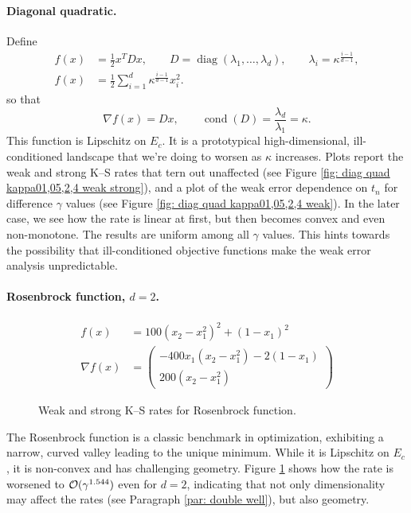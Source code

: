 \documentclass[12pt]{article}
\begin{document}
\paragraph{Diagonal quadratic.}
Define
\begin{align*}
    f(x) &= \frac{1}{2} x^T D x, \qquad D = \operatorname{diag}(\lambda_1, \dots, \lambda_d), \qquad \lambda_i = \kappa^{\frac{i-1}{d-1}},\\
    f(x) &= \frac{1}{2} \sum_{i=1}^d \kappa^{\frac{i-1}{d-1}} x_i^2.
\end{align*}
so that
\[
    \nabla f(x) = D x, \qquad \operatorname{cond}(D) = \frac{\lambda_d}{\lambda_1} = \kappa.
\]
This function is Lipschitz on $E_c$.
It is a prototypical high-dimensional, ill-conditioned landscape that we're doing to worsen as $\kappa$ increases.
Plots report the weak and strong K--S rates that tern out unaffected (see Figure \ref{fig: diag quad kappa01,05,2,4 weak strong}), and a plot of the weak error dependence on $t_n$ for difference $\gamma$ values (see Figure \ref{fig: diag quad kappa01,05,2,4 weak}).
In the later case, we see how the rate is linear at first, but then becomes convex and even non-monotone.
The results are uniform among all $\gamma$ values.
This hints towards the possibility that ill-conditioned objective functions make the weak error analysis unpredictable.

\paragraph{Rosenbrock function, $d=2$.}
\begin{align*}
    f(x) &= 100(x_2 - x_1^2)^2 + (1 - x_1)^2\\
    \nabla f(x) &=
    \begin{pmatrix}
        -400 x_1 (x_2 - x_1^2) - 2 (1 - x_1) \\
        200 (x_2 - x_1^2)
    \end{pmatrix}
\end{align*}
\begin{figure}
    \centering
    \caption{Weak and strong K--S rates for Rosenbrock function.}
    \label{fig: rosenbrock d2 n_rep20}
\end{figure}

The Rosenbrock function is a classic benchmark in optimization, exhibiting a narrow, curved valley leading to the unique minimum. While it is Lipschitz on $E_c$ , it is non-convex and has challenging geometry.
Figure \ref{fig: rosenbrock d2 n_rep20} shows how the rate is worsened to $\mathcal{O}(\gamma^{1.544})$ even for $d=2$, indicating that not only dimensionality may affect the rates (see Paragraph \ref{par: double well}), but also geometry.
\end{document}

